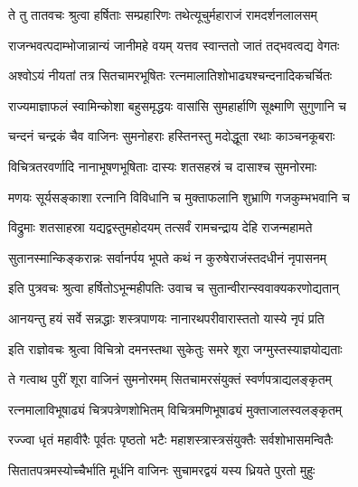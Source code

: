 \resetShloka


\twolineshloka
{ते तु तातवचः श्रुत्वा हर्षिताः सम्प्रहारिणः}
{तथेत्यूचुर्महाराजं रामदर्शनलालसम्}%


\twolineshloka
{राजन्भवत्पदाम्भोजान्नान्यं जानीमहे वयम्}
{यत्तव स्वान्ततो जातं तद्भवत्वद्य वेगतः}%

\twolineshloka
{अश्वोऽयं नीयतां तत्र सितचामरभूषितः}
{रत्नमालातिशोभाढ्यश्चन्दनादिकचर्चितः}%

\twolineshloka
{राज्यमाज्ञाफलं स्वामिन्कोशा बहुसमृद्धयः}
{वासांसि सुमहार्हाणि सूक्ष्माणि सुगुणानि च}%

\twolineshloka
{चन्दनं चन्द्रकं चैव वाजिनः सुमनोहराः}
{हस्तिनस्तु मदोद्धूता रथाः काञ्चनकूबराः}%

\twolineshloka
{विचित्रतरवर्णादि नानाभूषणभूषिताः}
{दास्यः शतसहस्रं च दासाश्च सुमनोरमाः}%

\twolineshloka
{मणयः सूर्यसङ्काशा रत्नानि विविधानि च}
{मुक्ताफलानि शुभ्राणि गजकुम्भभवानि च}%

\twolineshloka
{विद्रुमाः शतसाहस्रा यद्यद्वस्तुमहोदयम्}
{तत्सर्वं रामचन्द्राय देहि राजन्महामते}%

\twolineshloka
{सुतानस्मान्किङ्करान्नः सर्वानर्पय भूपते}
{कथं न कुरुषेराजंस्तदधीनं नृपासनम्}%


\twolineshloka
{इति पुत्रवचः श्रुत्वा हर्षितोऽभून्महीपतिः}
{उवाच च सुतान्वीरान्स्ववाक्यकरणोद्यतान्}%


\twolineshloka
{आनयन्तु हयं सर्वे सन्नद्धाः शस्त्रपाणयः}
{नानारथपरीवारास्ततो यास्ये नृपं प्रति}%


\twolineshloka
{इति राज्ञोवचः श्रुत्वा विचित्रो दमनस्तथा}
{सुकेतुः समरे शूरा जग्मुस्तस्याज्ञयोद्यताः}%

\twolineshloka
{ते गत्वाथ पुरीं शूरा वाजिनं सुमनोरमम्}
{सितचामरसंयुक्तं स्वर्णपत्राद्यलङ्कृतम्}%

\twolineshloka
{रत्नमालाविभूषाढ्यं चित्रपत्रेणशोभितम्}
{विचित्रमणिभूषाढ्यं मुक्ताजालस्वलङ्कृतम्}%

\twolineshloka
{रज्ज्वा धृतं महावीरैः पूर्वतः पृष्ठतो भटैः}
{महाशस्त्रास्त्रसंयुक्तैः सर्वशोभासमन्वितैः}%

\twolineshloka
{सितातपत्रमस्योच्चैर्भाति मूर्धनि वाजिनः}
{सुचामरद्वयं यस्य ध्रियते पुरतो मुहुः}%

